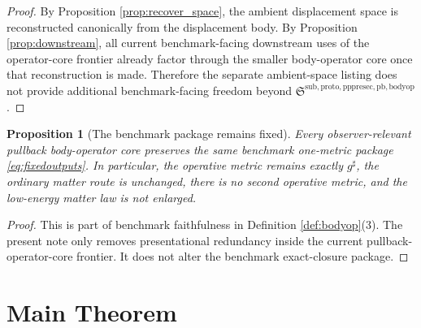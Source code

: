 \documentclass[11pt]{article}
\newcommand{\CompletedMetric}{g^{\sharp}}
\newcommand{\PullbackBodyOperatorCore}{\mathfrak S^{\mathrm{sub,proto,pppresec,pb,bodyop}}}
\newtheorem{proposition}{Proposition}
\begin{document}
\begin{proof}
By Proposition \ref{prop:recover_space}, the ambient displacement space is reconstructed canonically from the displacement body. By Proposition \ref{prop:downstream}, all current benchmark-facing downstream uses of the operator-core frontier already factor through the smaller body-operator core once that reconstruction is made. Therefore the separate ambient-space listing does not provide additional benchmark-facing freedom beyond \(\PullbackBodyOperatorCore\).
\end{proof}

\begin{proposition}[The benchmark package remains fixed]
\label{prop:benchmark}
Every observer-relevant pullback body-operator core preserves the same benchmark one-metric package \eqref{eq:fixedoutputs}. In particular, the operative metric remains exactly \(\CompletedMetric\), the ordinary matter route is unchanged, there is no second operative metric, and the low-energy matter law is not enlarged.
\end{proposition}

\begin{proof}
This is part of benchmark faithfulness in Definition \ref{def:bodyop}(3). The present note only removes presentational redundancy inside the current pullback-operator-core frontier. It does not alter the benchmark exact-closure package.
\end{proof}

\section{Main Theorem}
\end{document}
